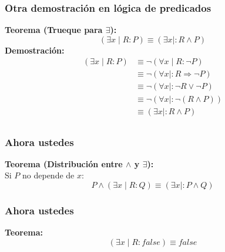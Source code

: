 \documentclass{beamer}
\newcommand{\then}{\Rightarrow}
\begin{document}
\begin{frame}[fragile]
    \frametitle{Otra demostración en lógica de predicados}
    \textbf{Teorema (Trueque para $\exists$):}
    $$(\exists x \mid R : P) \equiv (\exists x \mid : R \land P)$$
    \textbf{Demostración:} \\
    \begin{align*}
        (\exists x \mid R : P) &\equiv \lnot (\forall x \mid R : \lnot P) \tag{De Morgan gen.}\\ 
        &\equiv \lnot (\forall x \mid : R \then \lnot P) \tag{trueque para $\forall$}\\
        &\equiv \lnot (\forall x \mid : \lnot R \lor \lnot P) \tag{definición $\then$}\\
        &\equiv \lnot (\forall x \mid : \lnot (R \land P)) \tag{De Morgan }\\
        &\equiv (\exists x \mid : R \land P) \tag{De Morgan gen.}\\
    \end{align*}
\end{frame}

\begin{frame}[fragile]
    \frametitle{Ahora ustedes}
    \textbf{Teorema (Distribución entre $\land$ y $\exists$):} \\
    Si $P$ no depende de $x$:
    $$P \land (\exists x \mid R : Q) \equiv (\exists x \mid : P \land Q)$$
\end{frame}

\begin{frame}[fragile]
    \frametitle{Ahora ustedes}
    \textbf{Teorema:} \\
    $$(\exists x \mid R : false) \equiv false$$
\end{frame}
\end{document}
